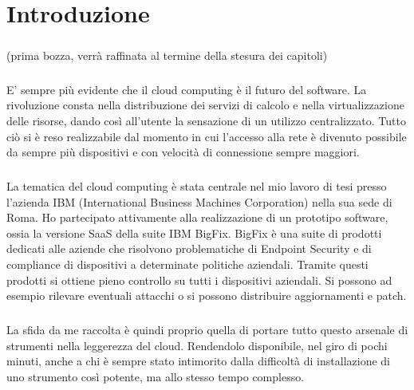 \chapter{Introduzione}

\paragraph{}
(prima bozza, verrà raffinata al termine della stesura dei capitoli)

\paragraph{}
E' sempre più evidente che il cloud computing è il futuro del software. La rivoluzione consta nella distribuzione dei servizi di calcolo e nella virtualizzazione delle risorse, dando così all'utente la sensazione di un utilizzo centralizzato. Tutto ciò si è reso realizzabile dal momento in cui l'accesso alla rete è divenuto possibile da sempre più dispositivi e con velocità di connessione sempre maggiori.
\paragraph{}
La tematica del cloud computing è stata centrale nel mio lavoro di tesi presso l'azienda IBM (International Business Machines Corporation) nella sua sede di Roma. Ho partecipato attivamente alla realizzazione di un prototipo software, ossia la versione SaaS della suite IBM BigFix. BigFix è una suite di prodotti dedicati alle aziende che risolvono problematiche di Endpoint Security e di compliance di dispositivi a determinate politiche aziendali. Tramite questi prodotti si ottiene pieno controllo su tutti i dispositivi aziendali. Si possono ad esempio rilevare eventuali attacchi o si possono distribuire aggiornamenti e patch.
\paragraph{}
La sfida da me raccolta è quindi proprio quella di portare tutto questo arsenale di strumenti nella leggerezza del cloud. Rendendolo disponibile, nel giro di pochi minuti, anche a chi è sempre stato intimorito dalla difficoltà di installazione di uno strumento così potente, ma allo stesso tempo complesso.